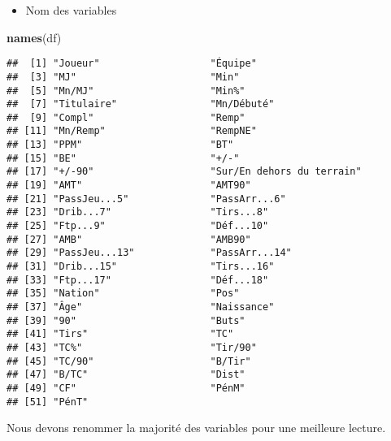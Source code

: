 \documentclass[7pt,]{report}
\newenvironment{Shaded}{\begin{snugshade}}{\end{snugshade}}
\newcommand{\KeywordTok}[1]{\textcolor[rgb]{0.13,0.29,0.53}{\textbf{#1}}}
\newcommand{\NormalTok}[1]{#1}
\providecommand{\tightlist}{%
  \setlength{\itemsep}{0pt}\setlength{\parskip}{0pt}}
\begin{document}
\begin{itemize}
\tightlist
\item
  Nom des variables
\end{itemize}

\begin{Shaded}
\begin{Highlighting}[]
\KeywordTok{names}\NormalTok{(df)}
\end{Highlighting}
\end{Shaded}

\begin{verbatim}
##  [1] "Joueur"                   "Équipe"                  
##  [3] "MJ"                       "Min"                     
##  [5] "Mn/MJ"                    "Min%"                    
##  [7] "Titulaire"                "Mn/Débuté"               
##  [9] "Compl"                    "Remp"                    
## [11] "Mn/Remp"                  "RempNE"                  
## [13] "PPM"                      "BT"                      
## [15] "BE"                       "+/-"                     
## [17] "+/-90"                    "Sur/En dehors du terrain"
## [19] "AMT"                      "AMT90"                   
## [21] "PassJeu...5"              "PassArr...6"             
## [23] "Drib...7"                 "Tirs...8"                
## [25] "Ftp...9"                  "Déf...10"                
## [27] "AMB"                      "AMB90"                   
## [29] "PassJeu...13"             "PassArr...14"            
## [31] "Drib...15"                "Tirs...16"               
## [33] "Ftp...17"                 "Déf...18"                
## [35] "Nation"                   "Pos"                     
## [37] "Âge"                      "Naissance"               
## [39] "90"                       "Buts"                    
## [41] "Tirs"                     "TC"                      
## [43] "TC%"                      "Tir/90"                  
## [45] "TC/90"                    "B/Tir"                   
## [47] "B/TC"                     "Dist"                    
## [49] "CF"                       "PénM"                    
## [51] "PénT"
\end{verbatim}

Nous devons renommer la majorité des variables pour une meilleure lecture.
\end{document}
